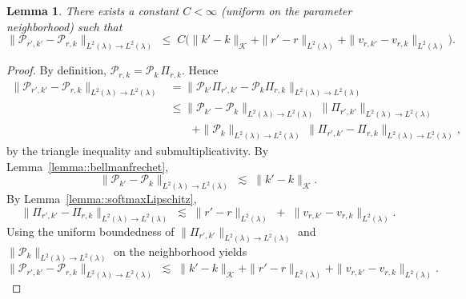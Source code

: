 \documentclass[11pt]{article}
\theoremstyle{plain}
\newtheorem{lemma}[theorem]{Lemma}
\begin{document}
\begin{lemma}
\label{lemma::forwardopLipschitz}
There exists a constant $C<\infty$ (uniform on the parameter neighborhood) such that
\[
\|\mathcal{P}_{r',k'} - \mathcal{P}_{r,k}\|_{L^2(\lambda) \to L^2(\lambda)}
\;\le\; C\Big(\|k' - k\|_{\mathcal K} + \|r' - r\|_{L^2(\lambda)}
+ \|v_{r,k'}-v_{r,k}\|_{L^2(\lambda)}\Big).
\]
\end{lemma}

\begin{proof}
By definition, $\mathcal{P}_{r,k} = \mathcal{P}_k \,\Pi_{r,k}$. Hence
\begin{align*}
\|\mathcal{P}_{r',k'} - \mathcal{P}_{r,k}\|_{L^2(\lambda)\to L^2(\lambda)}
&= \|\mathcal{P}_{k'}\Pi_{r',k'} - \mathcal{P}_k \Pi_{r,k}\|_{L^2(\lambda)\to L^2(\lambda)} \\
&\le \|\mathcal{P}_{k'}-\mathcal{P}_k\|_{L^2(\lambda)\to L^2(\lambda)}\,
\|\Pi_{r',k'}\|_{L^2(\lambda)\to L^2(\lambda)} \\
&\qquad + \|\mathcal{P}_k\|_{L^2(\lambda)\to L^2(\lambda)}\,
\|\Pi_{r',k'}-\Pi_{r,k}\|_{L^2(\lambda)\to L^2(\lambda)},
\end{align*}
by the triangle inequality and submultiplicativity. By Lemma~\ref{lemma::bellmanfrechet},
\[
\|\mathcal{P}_{k'}-\mathcal{P}_k\|_{L^2(\lambda)\to L^2(\lambda)} \;\lesssim\; \|k' - k\|_{\mathcal K}.
\]
By Lemma~\ref{lemma::softmaxLipschitz},
\[
\|\Pi_{r',k'}-\Pi_{r,k}\|_{L^2(\lambda)\to L^2(\lambda)} \;\lesssim\; \|r'-r\|_{L^2(\lambda)} \;+\; \|v_{r,k'}-v_{r,k}\|_{L^2(\lambda)}.
\]
Using the uniform boundedness of $\|\Pi_{r',k'}\|_{L^2(\lambda)\to L^2(\lambda)}$ and $\|\mathcal{P}_k\|_{L^2(\lambda)\to L^2(\lambda)}$ on the neighborhood yields
\[
\|\mathcal{P}_{r',k'} - \mathcal{P}_{r,k}\|_{L^2(\lambda) \to L^2(\lambda)}
\;\lesssim\; \|k' - k\|_{\mathcal K} + \|r' - r\|_{L^2(\lambda)}
+ \|v_{r,k'}-v_{r,k}\|_{L^2(\lambda)}.
\]
\end{proof}
\end{document}
